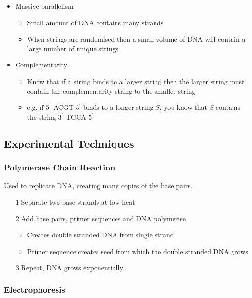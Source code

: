 \documentclass[a4paper]{article}
\begin{document}
\begin{itemize}
  \item Massive parallelism
    \begin{itemize}
      \item Small amount of DNA contains many strands
      \item When strings are randomised then a small volume of DNA will contain
            a large number of unique strings
    \end{itemize}

  \item Complementarity
    \begin{itemize}
      \item Know that if a string binds to a larger string then the larger
            string must contain the complementarity string to the smaller string
      \item e.g. if $5^{\prime}$ ACGT $3^{\prime}$ binds to a longer string
            $S$, you know that $S$ contains the string $3^{\prime}$ TGCA
            $5^{\prime}$
    \end{itemize}
\end{itemize}

\subsection{Experimental Techniques}

\subsubsection{Polymerase Chain Reaction}

Used to replicate DNA, creating many copies of the base pairs.

\begin{enumerate}
  \item[1] Separate two base strands at low heat
  \item[2] Add base pairs, primer sequences and DNA polymerise
    \begin{itemize}
      \item Creates double stranded DNA from single strand
      \item Primer sequence creates seed from which the double stranded DNA
            grows
    \end{itemize}
  \item[3] Repeat, DNA grows exponentially
\end{enumerate}

\subsubsection{Electrophoresis}
\end{document}
